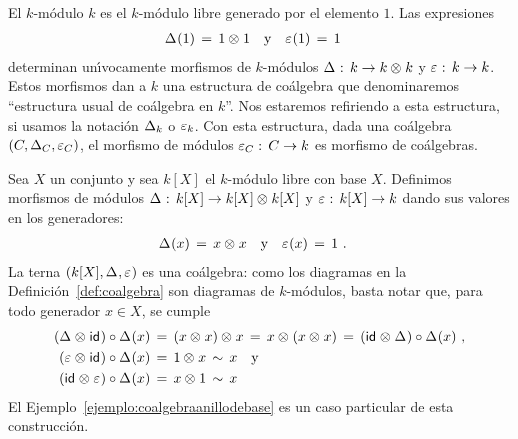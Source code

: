 \begin{ejemploCoalgebra}\label{ejemplo:coalgebraanillodebase}
	El $k$-m\'{o}dulo $k$ es el $k$-m\'{o}dulo libre generado por el
	elemento $1$. Las expresiones
	\begin{align*}
		\coproducto(1) \,=\,1\tensor 1 & \quad\text{y}\quad
			\counidad(1)\,=\,1
	\end{align*}
	determinan un\'{\i}vocamente morfismos de $k$-m\'{o}dulos
	$\coproducto:\,k\rightarrow k\tensor k$ y $\counidad:\,k\rightarrow k$.
	Estos morfismos dan a $k$ una estructura de co\'{a}lgebra que
	denominaremos ``estructura usual de co\'{a}lgebra en $k$''. Nos
	estaremos refiriendo a esta estructura, si usamos la notaci\'{o}n
	$\coproducto[k]$ o $\counidad[k]$. Con esta estructura, dada una
	co\'{a}lgebra $(C,\coproducto[C],\counidad[C])$, el morfismo de
	m\'{o}dulos $\counidad[C]:\,C\rightarrow k$ es morfismo de
	co\'{a}lgebras.
\end{ejemploCoalgebra}

\begin{ejemploCoalgebra}\label{ejemplo:coalgebradeconjunto}
	Sea $X$ un conjunto y sea $k[X]$ el $k$-m\'{o}dulo libre con base $X$.
	Definimos morfismos de m\'{o}dulos
	$\coproducto:\,k[X]\rightarrow k[X]\tensor k[X]$ y
	$\counidad:\,k[X]\rightarrow k$ dando sus valores en los generadores:
	\begin{align*}
		\coproducto(x) \,=\, x\tensor x & \quad\text{y}\quad
			\counidad(x)\,=\,1
		\text{ .}
	\end{align*}
	La terna $(k[X],\coproducto,\counidad)$ es una co\'{a}lgebra: como los
	diagramas en la Definici\'{o}n~\ref{def:coalgebra} son diagramas de
	$k$-m\'{o}dulos, basta notar que, para todo generador $x\in X$, se
	cumple
	\begin{align*}
		(\coproducto\tensor\id)\circ\coproducto(x) & \,=\,
			(x\tensor x)\tensor x \,=\,
			x\tensor (x\tensor x) \,=\,
			(\id\tensor\coproducto)\circ\coproducto(x) \text{ ,} \\
		(\counidad\tensor\id)\circ\coproducto(x) & \,=\,
			1\tensor x \,\sim\, x \quad\text {y} \\
		(\id\tensor\counidad)\circ\coproducto(x) & \,=\,
			x\tensor 1 \,\sim\,x
	\end{align*}
	El Ejemplo~\ref{ejemplo:coalgebraanillodebase} es un caso particular de
	esta construcci\'{o}n.
\end{ejemploCoalgebra}

